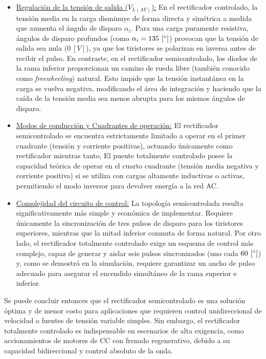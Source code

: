 \documentclass[12pt,a4paper]{article}
\begin{document}
\begin{itemize}
    \item \underline{Regulación de la tensión de salida ($V_{L(AV)}$):} En el rectificador controlado, la tensión media en la carga disminuye de forma directa y simétrica a medida que aumenta el ángulo de disparo $\alpha_{i}$. Para una carga puramente resistiva, ángulos de disparo profundos (como $\alpha_{i} = 135 \ [\degree]$) provocan que la tensión de salida sea nula ($0 \ [V]$), ya que los tiristores se polarizan en inversa antes de recibir el pulso. En contraste, en el rectificador semicontrolado, los diodos de la rama inferior proporcionan un camino de rueda libre (también conocido como \textit{freewheeling}) natural. Esto impide que la tensión instantánea en la carga se vuelva negativa, modificando el área de integración y haciendo que la caída de la tensión media sea menos abrupta para los mismos ángulos de disparo.
    
    \item \underline{Modos de conducción y Cuadrantes de operación:} El rectificador semicontrolado se encuentra estrictamente limitado a operar en el primer cuadrante (tensión y corriente positivas), actuando únicamente como rectificador mientras tanto, El puente totalmente controlado posee la capacidad teórica de operar en el cuarto cuadrante (tensión media negativa y corriente positiva) si se utiliza con cargas altamente inductivas o activas, permitiendo el modo inversor para devolver energía a la red AC.
    
    \item \underline{Complejidad del circuito de control:} La topología semicontrolada resulta significativamente más simple y económica de implementar. Requiere únicamente la sincronización de tres pulsos de disparo para los tiristores superiores, mientras que la mitad inferior conmuta de forma natural. Por otro lado, el rectificador totalmente controlado exige un esquema de control más complejo, capaz de generar y aislar seis pulsos sincronizados (uno cada $60 \ [\degree]$) y, como se demostró en la simulación, requiere garantizar un ancho de pulso adecuado para asegurar el encendido simultáneo de la rama superior e inferior.
\end{itemize}

Se puede concluir entonces que el rectificador semicontrolado es una solución óptima y de menor costo para aplicaciones que requieren control unidireccional de velocidad o fuentes de tensión variable simples. Sin embargo, el rectificador totalmente controlado es indispensable en escenarios de alta exigencia, como accionamientos de motores de CC con frenado regenerativo, debido a su capacidad bidireccional y control absoluto de la onda.
\end{document}
